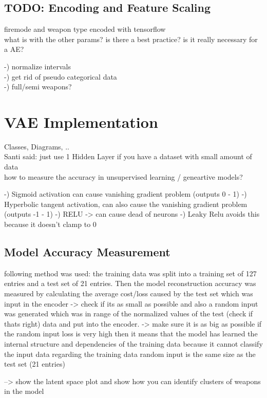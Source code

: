 \documentclass[MGS,Master,english]{twbook}%
\begin{document}
\subsection{TODO: Encoding and Feature Scaling}
firemode and weapon type encoded with tensorflow\\
what is with the other params? is there a best practice? is it really necessary for a AE? 

-) normalize intervals\\
-) get rid of pseudo categorical data \\
-) full/semi weapons?



\section{VAE Implementation}
Classes, Diagrams, ..\\
Santi said: just use 1 Hidden Layer if you have a dataset with small amount of data\\
how to measure the accuracy in unsupervised learning / geneartive models?

-) Sigmoid activation can cause vanishing gradient problem (outputs 0 - 1)
-) Hyperbolic tangent activation, can also cause the vanishing gradient problem (outputs -1 - 1)
-) RELU -> can cause dead of neurons
-) Leaky Relu avoids this because it doesn't clamp to 0

\subsection{Model Accuracy Measurement}
following method was used: 
the training data was split into a training set of 127 entries and a test set of 21 entries. 
Then the model reconstruction accuracy was measured by calculating the average cost/loss caused by the test set which was input in the encoder -> check if its as small as possible
and also a random input was generated which was in range of the normalized values of the test (check if thats right) data and put into the encoder. -> make sure it is as big as possible
if the random input loss is very high then it means that the model has learned the internal structure and dependencies of the training data because it cannot classify the input data regarding the training data
random input is the same size as the test set (21 entries)

--> show the latent space plot and show how you can identify clusters of weapons in the model
\end{document}
